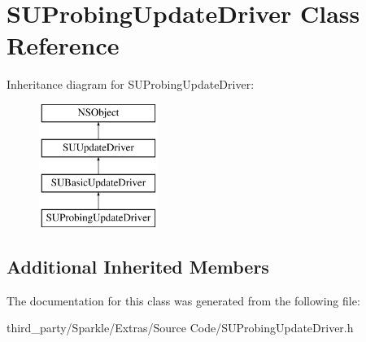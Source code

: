 \hypertarget{interface_s_u_probing_update_driver}{}\section{S\+U\+Probing\+Update\+Driver Class Reference}
\label{interface_s_u_probing_update_driver}
Inheritance diagram for S\+U\+Probing\+Update\+Driver\+:\begin{figure}[H]
\begin{center}
\leavevmode
\includegraphics[height=4.000000cm]{interface_s_u_probing_update_driver}
\end{center}
\end{figure}
\subsection*{Additional Inherited Members}


The documentation for this class was generated from the following file\+:\begin{DoxyCompactItemize}
\item 
third\+\_\+party/\+Sparkle/\+Extras/\+Source Code/S\+U\+Probing\+Update\+Driver.\+h\end{DoxyCompactItemize}
